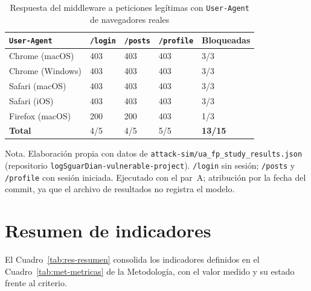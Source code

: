\begin{table}[H]
\centering
\small
\begin{tabular}{|L{3.6cm}|L{2.2cm}|L{2.2cm}|L{2.2cm}|L{2.0cm}|}
\hline
\textbf{\texttt{User-Agent}} & \textbf{\texttt{/login}} & \textbf{\texttt{/posts}} & \textbf{\texttt{/profile}} & \textbf{Bloqueadas} \\ \hline
Chrome (macOS) & 403 & 403 & 403 & 3/3 \\ \hline
Chrome (Windows) & 403 & 403 & 403 & 3/3 \\ \hline
Safari (macOS) & 403 & 403 & 403 & 3/3 \\ \hline
Safari (iOS) & 403 & 403 & 403 & 3/3 \\ \hline
Firefox (macOS) & 200 & 200 & 403 & 1/3 \\ \hline
\textbf{Total} & 4/5 & 4/5 & 5/5 & \textbf{13/15} \\ \hline
\end{tabular}
\caption[Falsos positivos con User-Agent de navegadores reales]{Respuesta del middleware a peticiones legítimas con \texttt{User-Agent} de navegadores reales}
\label{tab:res-ua}
\end{table}
{\footnotesize Nota. Elaboración propia con datos de \texttt{attack-sim/ua\_fp\_study\_results.json}
(repositorio \texttt{logSguarDian-vulnerable-project}). \texttt{/login} sin sesión; \texttt{/posts} y
\texttt{/profile} con sesión iniciada. Ejecutado con el par~A; atribución por la fecha del commit, ya
que el archivo de resultados no registra el modelo.}

\section{Resumen de indicadores}
\label{sec:res-resumen}

El Cuadro~\ref{tab:res-resumen} consolida los indicadores definidos en el
Cuadro~\ref{tab:met-metricas} de la Metodología, con el valor medido y su estado frente al
criterio.


